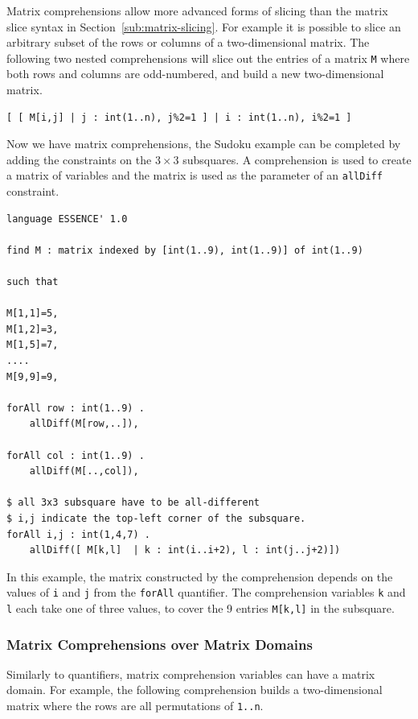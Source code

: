 \documentclass[a4paper]{article}
\begin{document}
Matrix comprehensions allow more advanced forms of slicing than the matrix slice syntax in
Section~\ref{sub:matrix-slicing}. For example it is possible to slice an arbitrary subset of the rows or 
columns of a two-dimensional matrix. The following two nested comprehensions will 
slice out the entries of a matrix \texttt{M} where both rows and columns are odd-numbered, 
and build a new two-dimensional matrix. 

\begin{verbatim}
[ [ M[i,j] | j : int(1..n), j%2=1 ] | i : int(1..n), i%2=1 ]
\end{verbatim}

Now we have matrix comprehensions, the Sudoku example can be completed by adding
the constraints on the $3\times 3$ subsquares. A comprehension is used to 
create a matrix of variables and the matrix is used as the parameter of an
\texttt{allDiff} constraint. 

\begin{verbatim}
language ESSENCE' 1.0

find M : matrix indexed by [int(1..9), int(1..9)] of int(1..9)

such that

M[1,1]=5,
M[1,2]=3,
M[1,5]=7,
....
M[9,9]=9,

forAll row : int(1..9) .
    allDiff(M[row,..]),

forAll col : int(1..9) .
    allDiff(M[..,col]),	 

$ all 3x3 subsquare have to be all-different
$ i,j indicate the top-left corner of the subsquare. 
forAll i,j : int(1,4,7) .
    allDiff([ M[k,l]  | k : int(i..i+2), l : int(j..j+2)])
\end{verbatim}

In this example, the matrix constructed by the comprehension depends on the values 
of \texttt{i} and \texttt{j} from the \texttt{forAll} quantifier.  The comprehension 
variables \texttt{k} and \texttt{l} each take one of three values, to cover the 9 entries \texttt{M[k,l]} in the 
subsquare. 

\subsubsection{Matrix Comprehensions over Matrix Domains}

Similarly to quantifiers, matrix comprehension variables can have a matrix domain.
For example, the following comprehension builds a two-dimensional matrix where
the rows are all permutations of \texttt{1..n}. 
\end{document}
